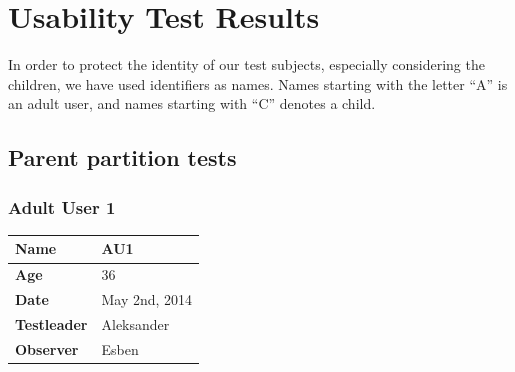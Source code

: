 \section{Usability Test Results}
\label{sec:usabilityresults}
In order to protect the identity of our test subjects, especially considering the children, we have used identifiers as names. Names starting with the letter ``A'' is an adult user, and names starting with ``C'' denotes a child.

\subsection{Parent partition tests}

\subsubsection{Adult User 1}
\begin{table}[H]
\centering
\begin{tabular}{|p{4.0cm} | p{4.0cm} |}
	\hline
	\textbf{Name} & AU1\\
	\hline
	\textbf{Age} & 36 \\
	\hline
	\textbf{Date} & May 2nd, 2014 \\
	\hline
	\textbf{Testleader} & Aleksander\\
	\hline
	\textbf{Observer} & Esben\\
	\hline	
\end{tabular}
\end{table}

